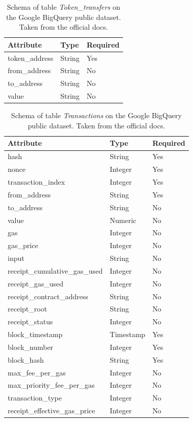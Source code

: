 \begin{table}[H]
\centering
    \begin{tabular}  { m{6cm} m{3cm} m{3cm} } 
    \toprule
    \textbf{Attribute} & \textbf{Type} & \textbf{Required} \\
    \midrule
    token\_address & String & Yes	 \\			
    from\_address & String & No \\
    to\_address & String	& No	\\			
    value & String	& No	\\
    \bottomrule
\end{tabular}
\caption[Google BigQuery \texttt{Token\_transfers} table]{Schema of table \textit{Token\_transfers} on the Google BigQuery public dataset. Taken from the official docs.}
\label{table:bigquery-transfers}
\end{table}

\begin{table}[H]
\centering
    \begin{tabular}  { m{6cm} m{3cm} m{3cm} } 
    \toprule
    \textbf{Attribute} & \textbf{Type} & \textbf{Required} \\
    \midrule
    hash & String	& Yes		\\		
    nonce & Integer	& Yes \\				
    transaction\_index & Integer	& Yes		\\		
    from\_address & String	& Yes			\\	
    to\_address & String	& No		\\		
    value & Numeric	& No \\				
    gas &  Integer	& No \\				 
    gas\_price &  Integer &	No \\				
    input &  String	& No \\				
    receipt\_cumulative\_gas\_used & Integer & 	No \\				
    receipt\_gas\_used  & Integer	& No \\				
    receipt\_contract\_address & String	& No \\				
    receipt\_root &  String & 	No \\				
    receipt\_status  & Integer & 	No \\				
    block\_timestamp  & Timestamp	 & Yes \\				
    block\_number  & Integer & 	Yes \\				
    block\_hash & String &	Yes \\				
    max\_fee\_per\_gas & Integer	& No \\	
    max\_priority\_fee\_per\_gas & Integer	& No \\		
    transaction\_type & Integer	& No				\\
    receipt\_effective\_gas\_price & Integer	& No	\\
    \bottomrule
\end{tabular}
\caption[Google BigQuery \texttt{Transactions} table]{Schema of table \textit{Transactions} on the Google BigQuery public dataset. Taken from the official docs.}
\label{table:bigquery-transactions}
\end{table}

